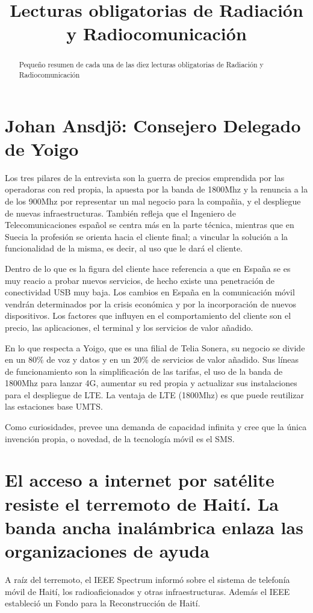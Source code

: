 \documentclass[twocolumn]{article}
\title{Lecturas obligatorias de Radiación y Radiocomunicación}
\author{}
\date{}
\begin{document}
\maketitle

\begin{abstract}

Pequeño resumen de cada una de las diez lecturas obligatorias de Radiación y Radiocomunicación

\end{abstract}



\section{Johan Ansdjö: Consejero Delegado de Yoigo}
Los tres pilares de la entrevista son la guerra de precios emprendida por las operadoras con red propia, la apuesta por la banda de 1800Mhz y la renuncia a la de los 900Mhz por representar un mal negocio para la compañia, y el despliegue de nuevas infraestructuras. También refleja que el Ingeniero de Telecomunicaciones español se centra más en la parte técnica, mientras que en Suecia la profesión se orienta hacia el cliente final; a vincular la solución a la funcionalidad de la misma, es decir, al uso que le dará el cliente.

Dentro de lo que es la figura del cliente hace referencia a que en España se es muy reacio a probar nuevos servicios, de hecho existe una penetración de conectividad USB muy baja. Los cambios en España en la comunicación móvil vendrán determinados por la crisis económica y por la incorporación de nuevos dispositivos. Los factores que influyen en el comportamiento del cliente son el precio, las aplicaciones, el terminal y los servicios de valor añadido.

En lo que respecta a Yoigo, que es una filial de Telia Sonera, su negocio se divide en un 80\% de voz y datos y en un 20\% de servicios de valor añadido. Sus líneas de funcionamiento son la simplificación de las tarifas, el uso de la banda de 1800Mhz para lanzar 4G, aumentar su red propia y actualizar sus instalaciones para el despliegue de LTE. La ventaja de LTE (1800Mhz) es que puede reutilizar las estaciones base UMTS.

Como curiosidades, prevee una demanda de capacidad infinita y cree que la única invención propia, o novedad, de la tecnología móvil es el SMS.

\section{El acceso a internet por satélite resiste el terremoto de Haití. La banda ancha inalámbrica enlaza las organizaciones de ayuda}
A raíz del terremoto, el IEEE Spectrum informó sobre el sistema de telefonía móvil de Haití, los radioaficionados y otras infraestructuras. Además el IEEE estableció un Fondo para la Reconstrucción de Haití.
\end{document}
